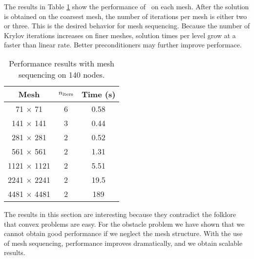 The results in Table \ref{tab:mesh} show 
the performance of \tron\ on each mesh.
After the solution is obtained on the coarsest
mesh, the number of iterations per mesh is either two or three.
This is the desired behavior for mesh sequencing.
Because the number of Krylov iterations increases on finer meshes,
solution times per level grow at a faster than linear rate.
Better preconditioners may further improve performace.

\begin{table}
\begin{center}
\caption{Performance results with mesh sequencing on 140 nodes.
\label{tab:mesh}}
\begin{tabular}{ccc}
  Mesh &  $ \mbox{$ n_{\mathrm{iters}} $} $ & Time (s)  \\
\hline
 71  $\times$  71  &  6     &   0.58    \\
 141 $\times$  141  &  3    &   0.44     \\
 281 $\times$  281  &  2    &   0.52     \\
 561 $\times$  561  &  2    &   1.31     \\
1121 $\times$  1121 &  2    &   5.51     \\
2241 $\times$  2241 &  2    &   19.5     \\
4481 $\times$  4481 &  2    &   189      \\
\hline
\end{tabular}
\end{center}
\end{table}

The results in this section are interesting because
they contradict the folklore that convex problems are easy.
For the obstacle problem we have shown that we cannot obtain
good performance if we neglect the mesh structure. 
With the use of mesh sequencing, performance improves dramatically,
and we obtain scalable results.

\begin{comment}

\textbf{Do we need these results?}

\begin{table}
  \centering
\begin{tabular}{c cc cc cc cc cc}
      & \multicolumn{8}{c}{Number of processors} \\ \cline{2-9}
      &  \multicolumn{2}{c}{20} & \multicolumn{2}{c}{40}
      &  \multicolumn{2}{c}{80} & \multicolumn{2}{c}{160} 
\\  \cline{2-9}
 Mesh & \niters & time & \niters & time & \niters & time & \niters & time \\
\hline
 769 $\times$  769  &  17  &   283  &   10   &   142   &    7  &   86  &    7  &   86 \\
1537 $\times$  1537 &  73  &  3751  &   40   &  1861   &   22  &  938  &   22  &  938 \\
\hline
\end{tabular}
\caption{Performance results with mesh sequencing}
\label{tab:mesh}
\end{table}

\end{comment}

